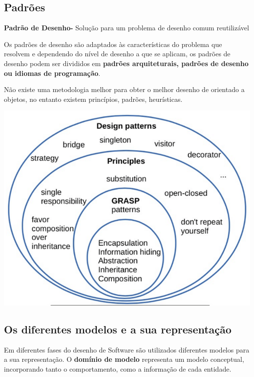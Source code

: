 \documentclass{article}
\begin{document}
\pagebreak

\subsection{Padrões}

\begin{flushleft}
    \textbf{Padrão de Desenho-} Solução para um problema de desenho comum reutilizável
\end{flushleft}

Os padrões de desenho são adaptados às características do problema que resolvem e dependendo
do nível de desenho a que se aplicam, os padrões de desenho podem ser divididos em \textbf{padrões arquiteturais,
padrões de desenho ou idiomas de programação}.

\vspace{3mm}
Não existe uma metodologia melhor para obter o melhor desenho de orientado a objetos,
no entanto existem princípios, padrões, heurísticas.

\vspace{3mm}

\begin{center}
    \includegraphics[scale=0.4]{Images/5.png}
\end{center}

\pagebreak
\subsection{Os diferentes modelos e a sua representação}

Em diferentes fases do desenho de Software são utilizados diferentes modelos para a
sua representação. O \textbf{domínio de modelo} representa um modelo conceptual,
incorporando tanto o comportamento, como a informação de cada entidade.
\end{document}

